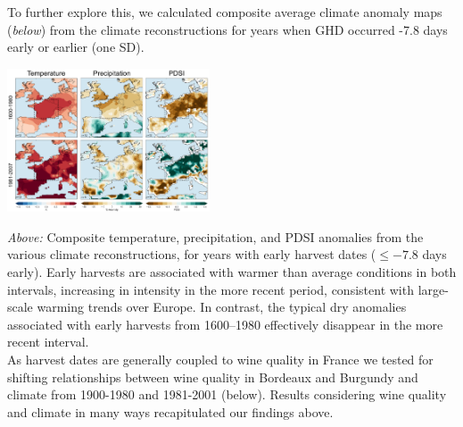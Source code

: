 \documentclass[portrait,a0,final] {a0poster} %
\begin{document}
\begin{multicols}{2}
\columnbreak
To further explore this, we calculated composite average climate anomaly maps (\emph{below}) from the climate reconstructions for years when GHD occurred -7.8 days early or earlier (one SD). 
\vspace{2ex}
\begin{center}
\includegraphics[width=0.45\textwidth]{../MANUSCRIPT/fig_04_comp_map_JJA_comp.png}
\end{center}
\vspace{1ex}
\emph{Above:} Composite temperature, precipitation, and PDSI anomalies from the various climate reconstructions, for years with early harvest dates ($\le-7.8$ days early). Early harvests are associated with warmer than average conditions in both intervals, increasing in intensity in the more recent period, consistent with large-scale warming trends over Europe. In contrast, the typical dry anomalies associated with early harvests from 1600--1980 effectively disappear in the more recent interval.\\

\indent As harvest dates are generally coupled to wine quality in France we tested for shifting relationships between wine quality in Bordeaux and Burgundy and climate from 1900-1980 and 1981-2001 (below). Results considering wine quality and climate in many ways recapitulated our findings above.\\



\end{multicols}
\end{document}

